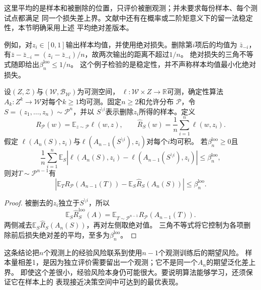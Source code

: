 这里平均的是样本和被删除的位置，只评价被删观测；并未要求每份样本、每个测试点都满足
同一个损失差上界。文献中还有在概率或二阶矩意义下的留一法稳定性，本节明确采用上述
平均绝对差版本。

例如，对$z_i\in[0,1]$输出样本均值，并使用绝对损失。删除第$i$项后的均值为
$\bar z_{-i}$，有$\bar z-\bar z_{-i}=(z_i-\bar z_{-i})/n$，故两次输出的距离不超过$1/n$。
绝对损失的三角不等式随即给出$\beta_n^{\mathrm{loo}}\leq1/n$。
这个例子检验的是稳定性，并不声称样本均值最小化绝对损失。

\begin{theorem}[留一法稳定性与期望风险]
\label{thm:loo-risk}
设$(Z,\mathcal Z)$与$(\mathcal W,\mathcal B_{\mathcal W})$为可测空间，
$\ell:\mathcal W\times Z\to\mathbb R$可测，确定性算法
$A_k:Z^k\to\mathcal W$对每个$k\geq1$均可测。固定$n\geq2$和允许分布
$\mathcal P$，令$S=(z_1,\ldots,z_n)\sim\mathcal P^n$，并以
$S^{\setminus i}$表示删除$z_i$所得的样本。定义
\[
 R_{\mathcal P}(w)=\mathbb E_{z\sim\mathcal P}\ell(w,z),
 \qquad
 \hat R_S(w)=\frac1n\sum_{i=1}^n\ell(w,z_i).
\]
假定
$\ell(A_n(S),z_i)$与$\ell(A_{n-1}(S^{\setminus i}),z_i)$对每个$i$均可积。
若$\beta_n^{\mathrm{loo}}\geq0$且
\[
 \frac1n\sum_{i=1}^n\mathbb E_S
 \left|\ell(A_n(S),z_i)-\ell(A_{n-1}(S^{\setminus i}),z_i)\right|
 \leq\beta_n^{\mathrm{loo}},
\]
则对$T\sim\mathcal P^{n-1}$有
\[
 \left|\mathbb E_T R_{\mathcal P}(A_{n-1}(T))
       -\mathbb E_S\hat R_S(A_n(S))\right|\leq\beta_n^{\mathrm{loo}}.
\]
\end{theorem}
\begin{proof}
被删去的$z_i$独立于$S^{\setminus i}$，所以
\[
 \mathbb E_S\hat R_S^{\mathrm{loo}}(A)
 =\mathbb E_{T\sim\mathcal P^{n-1}}R_{\mathcal P}(A_{n-1}(T)).
\]
两侧减去$\mathbb E_S\hat R_S(A_n(S))$，再对左侧取绝对值。
三角不等式将它控制为各项删除前后损失绝对差的平均，至多为$\beta_n^{\mathrm{loo}}$。
\end{proof}

这条结论把$n$个观测上的经验风险联系到使用$n-1$个观测训练后的期望风险。
样本量相差1，是因为独立评价需要留出一个观测；它不是同一个$A_n$的期望泛化差上界。
即使这个差很小，经验风险本身仍可能很大。要说明算法能够学习，还须保证它在样本上的
表现接近决策空间中可达到的最优表现。

